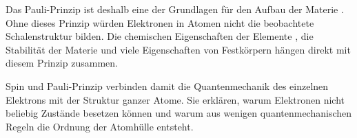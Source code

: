 Das Pauli-Prinzip ist deshalb eine der Grundlagen für den Aufbau der Materie
. Ohne dieses Prinzip würden Elektronen in Atomen nicht die
beobachtete Schalenstruktur bilden. Die chemischen Eigenschaften der Elemente
, die Stabilität der Materie und viele Eigenschaften
von Festkörpern hängen direkt mit diesem Prinzip zusammen.

Spin und Pauli-Prinzip verbinden damit die Quantenmechanik des einzelnen
Elektrons mit der Struktur ganzer Atome. Sie erklären, warum Elektronen nicht
beliebig Zustände besetzen können und warum aus wenigen quantenmechanischen
Regeln die Ordnung der Atomhülle entsteht.